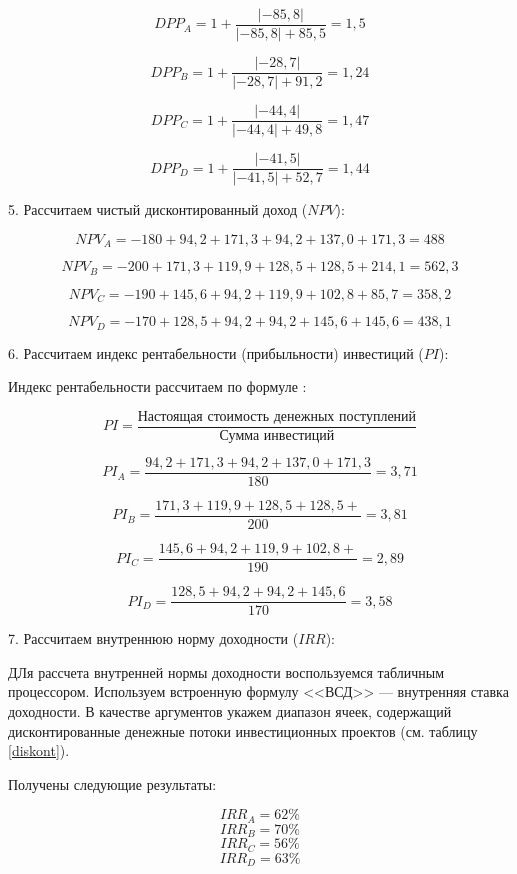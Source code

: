 \[ DPP_A =  1 + \dfrac{|-85,8|}{|-85,8| + 85,5} = 1,5\]

\[ DPP_B =  1 + \dfrac{|-28,7|}{|-28,7| + 91,2} = 1,24\]

\[ DPP_C =  1 + \dfrac{|-44,4|}{|-44,4| + 49,8} = 1,47 \]

\[ DPP_D = 1+ \dfrac{|-41,5|}{|-41,5| + 52,7} = 1,44 \]

5. Рассчитаем чистый дисконтированный доход ($NPV$):

\[ NPV_A =  -180 + 94,2  +171,3 + 94,2  + 137,0 + 171,3  = 488\]

\[ NPV_B =-200 +171,3 + 119,9 + 128,5 + 128,5 + 214,1 =562,3\]

\[ NPV_C =  -190+145,6+94,2+119,9+102,8+85,7=358,2\]

\[ NPV_D = -170+128,5+94,2+94,2+145,6+145,6=438,1\]

6. Рассчитаем индекс рентабельности (прибыльности) инвестиций ($PI$):

Индекс рентабельности рассчитаем по формуле \cite[218]{leontev}:

\[ PI = \dfrac{\text{Настоящая стоимость денежных поступлений}}{\text{Сумма инвестиций}} \]

\[ PI_A = \dfrac{94,2 +	171,3 +	94,2 	+137,0 +171,3
}{180}= 3,71\]

\[ PI_B = \dfrac{171,3 +	119,9 +	128,5 	+128,5 
+}{200}=3,81 \]

\[ PI_C = \dfrac{145,6 +	94,2 +	119,9 +	102,8 +}{190}= 2,89\]

\[ PI_D = \dfrac{128,5 +	94,2 +	94,2 +	145,6 
}{170}= 3,58\]

7. Рассчитаем внутреннюю норму доходности ($IRR$):

ДЛя рассчета внутренней нормы доходности воспользуемся табличным процессором. Используем встроенную формулу <<ВСД>> --- внутренняя ставка доходности. В качестве аргументов укажем диапазон ячеек, содержащий дисконтированные денежные потоки инвестиционных проектов (см. таблицу \ref{diskont}).

Получены следующие результаты:

\[ IRR_A = 62\%\]
\[ IRR_B = 70\%\]
\[ IRR_C = 56\%\]
\[ IRR_D = 63\%\]

